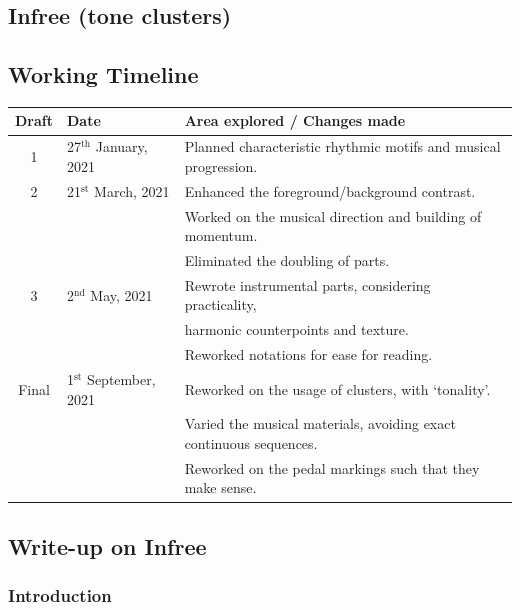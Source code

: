 \documentclass{article}
\begin{document}
\newpage
\begin{center}
\vspace*{\fill}
\LARGE
    \section{Infree (tone clusters)}
\vspace*{\fill}
%
\end{center}

\newpage

\subsection{Working Timeline}
\begin{center}
	\def\arraystretch{1.5}
\begin{tabular}{|c|l|l|}
	\hline
	Draft&Date&Area explored / Changes made\\
	\hline
	1&27\(^{\text{th}}\) January, 2021
    &Planned characteristic rhythmic motifs and musical progression.\\
	\hline
	2&21\(^{\text{st}}\) March, 2021
    &Enhanced the foreground/background contrast.\\
    &&Worked on the musical direction and building of momentum.\\
    &&Eliminated the doubling of parts.\\
	\hline
	3&2\(^{\text{nd}}\) May, 2021
    &Rewrote instrumental parts, considering practicality,\\
    &&harmonic counterpoints and texture.\\
    &&Reworked notations for ease for reading.\\
	\hline
	Final&1\(^{\text{st}}\) September, 2021
    &Reworked on the usage of clusters, with `tonality'.\\
    &&Varied the musical materials, avoiding exact continuous sequences.\\
    &&Reworked on the pedal markings such that they make sense.\\
	\hline
\end{tabular}
\end{center}

\subsection{Write-up on {\bf Infree}}

\subsubsection{Introduction}
\end{document}
